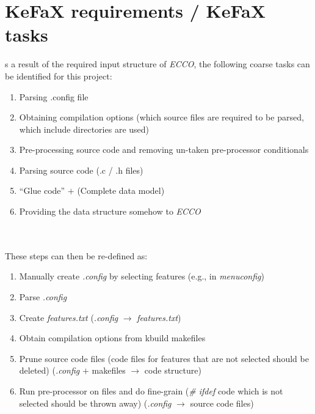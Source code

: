 \section{KeFaX requirements / KeFaX tasks}
s a result of the required input structure of {\it ECCO}, 
the following coarse tasks can be identified for this project:
\begin{enumerate}
 \item Parsing .config file
 \item Obtaining compilation options (which source files are required to be 
 parsed, which include directories are used)
 \item Pre-processing source code and removing un-taken 
 pre-processor conditionals
 \item Parsing source code (.c / .h files)
 \item ``Glue code'' $+$ (Complete data model)
 \item Providing the data structure somehow to {\it ECCO}
\end{enumerate}
\ \\
\ \\
These steps can then be re-defined as:
\begin{enumerate}
 \item\label{reqTaskFeatureCreate} Manually create {\it .config} by selecting features 
 (e.g., in {\it menuconfig})
 \item\label{reqTaskParseDotConfig} Parse {\it .config}
 \item\label{reqTaskFeatureTxtCreate} Create {\it features.txt}
 ({\it .config} $\rightarrow$ {\it features.txt})
 \item\label{reqTaskCompileOptions} Obtain compilation options from kbuild makefiles
 \item\label{reqTaskPruneSource} Prune source code files
 (code files for features that are not selected should be deleted)
 ({\it .config} $+$ makefiles $\rightarrow$ code structure)
 \item\label{reqTaskPreprocess} Run pre-processor on files and do fine-grain
 ({\it \# ifdef} code which is not selected should be thrown away)
 ({\it .config} $\rightarrow$ source code files)
\end{enumerate}

